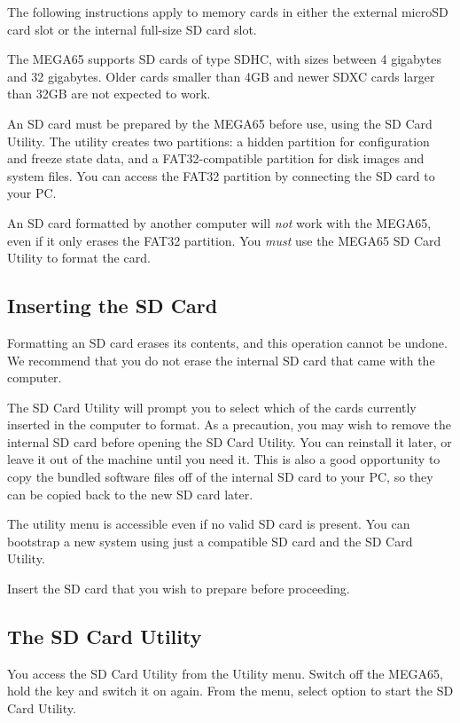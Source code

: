 The following instructions apply to memory cards in either the external microSD card slot or the internal full-size SD card slot.

The MEGA65 supports SD cards of type SDHC, with sizes between 4 gigabytes and 32 gigabytes. Older cards smaller than 4GB and newer SDXC cards larger than 32GB are not expected to work.

An SD card must be prepared by the MEGA65 before use, using the SD Card Utility. The utility creates two partitions: a hidden partition for configuration and freeze state data, and a FAT32-compatible partition for disk images and system files. You can access the FAT32 partition by connecting the SD card to your PC.

An SD card formatted by another computer will {\em not} work with the MEGA65, even if it only erases the FAT32 partition. You {\em must} use the MEGA65 SD Card Utility to format the card.

\subsection{Inserting the SD Card}

Formatting an SD card erases its contents, and this operation cannot be undone. We recommend that you do not erase the internal SD card that came with the computer.

The SD Card Utility will prompt you to select which of the cards currently inserted in the computer to format. As a precaution, you may wish to remove the internal SD card before opening the SD Card Utility. You can reinstall it later, or leave it out of the machine until you need it. This is also a good opportunity to copy the bundled software files off of the internal SD card to your PC, so they can be copied back to the new SD card later.

The utility menu is accessible even if no valid SD card is present. You can bootstrap a new system using just a compatible SD card and the SD Card Utility.

Insert the SD card that you wish to prepare before proceeding.

\subsection{The SD Card Utility}

You access the SD Card Utility from the Utility menu. Switch off the MEGA65, hold the  key and switch it on again. From the menu, select option  to start the SD Card Utility.


